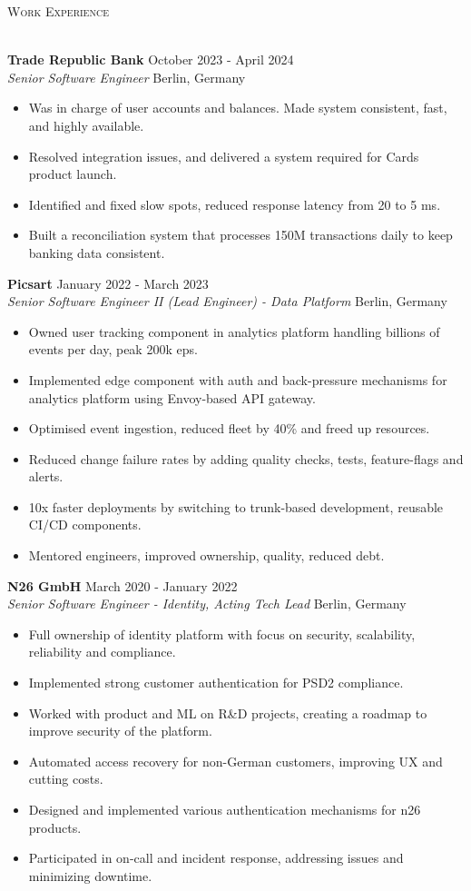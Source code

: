 \documentclass[a4paper]{article}
\newcommand{\lineunder} {
    \vspace*{-8pt} \\
    \hspace*{-18pt} \hrulefill \\
}
\newcommand{\header} [1] {
        {\hspace*{-18pt}\vspace*{6pt} \textsc{#1}}
    \vspace*{-6pt} \lineunder
}
\newcommand{\employer} [4] {
    \textbf{#1} \hfill {#3} \\
    \textit{#2} \hfill {#4} \\
    \vspace{0mm}
}
\begin{document}
    \header{Work Experience}
    \vspace{1mm}

    \employer{Trade Republic Bank}{Senior Software Engineer}{October 2023 - April 2024}{Berlin, Germany}
    \begin{itemize}[itemsep=-1mm]
        \item Was in charge of user accounts and balances.
        Made system consistent, fast, and highly available.
        \item Resolved integration issues, and delivered a system required for Cards product launch.
        \item Identified and fixed slow spots, reduced response latency from 20 to 5 ms.
        \item Built a reconciliation system that processes 150M transactions daily to keep banking data consistent.
    \end{itemize}

    \employer{Picsart}{Senior Software Engineer II (Lead Engineer) - Data Platform}{January 2022 - March 2023}{Berlin, Germany}
    \begin{itemize}[itemsep=-1mm]
        \item Owned user tracking component in analytics platform handling billions of events per day, peak 200k eps.
        \item Implemented edge component with auth and back-pressure mechanisms for analytics platform using Envoy-based API gateway.
        \item Optimised event ingestion, reduced fleet by 40\% and freed up resources.
        \item Reduced change failure rates by adding quality checks, tests, feature-flags and alerts.
        \item 10x faster deployments by switching to trunk-based development, reusable CI/CD components.
        \item Mentored engineers, improved ownership, quality, reduced debt.
    \end{itemize}

    \employer{N26 GmbH}{Senior Software Engineer - Identity, Acting Tech Lead}{March 2020 - January 2022}{Berlin, Germany}
    \begin{itemize}[itemsep=-1mm]
        \item Full ownership of identity platform with focus on security, scalability, reliability and compliance.
        \item Implemented strong customer authentication for PSD2 compliance.
        \item Worked with product and ML on R\&D projects, creating a roadmap to improve security of the platform.
        \item Automated access recovery for non-German customers, improving UX and cutting costs.
        \item Designed and implemented various authentication mechanisms for n26 products.
        \item Participated in on-call and incident response, addressing issues and minimizing downtime.
    \end{itemize}
\end{document}
